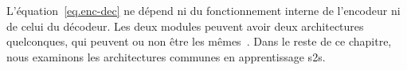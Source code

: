 L'équation~\ref{eq.enc-dec} ne dépend ni du fonctionnement interne de l'encodeur ni de celui du décodeur.
Les deux modules peuvent avoir deux architectures quelconques, qui peuvent ou non être les mêmes~\cite{deep-nmt-survey}.
Dans le reste de ce chapitre, nous examinons les architectures communes en apprentissage \gls{s2s}.


